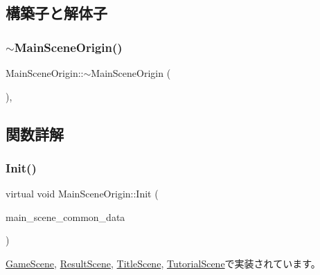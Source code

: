 \subsection{構築子と解体子}
\mbox{\label{class_main_scene_origin_af3fd8cd71354c8392040da486a538d67}} 
\subsubsection{\texorpdfstring{$\sim$\+Main\+Scene\+Origin()}{~MainSceneOrigin()}}
{\footnotesize\ttfamily Main\+Scene\+Origin\+::$\sim$\+Main\+Scene\+Origin (\begin{DoxyParamCaption}{ }\end{DoxyParamCaption})\hspace{0.3cm}{\ttfamily [inline]}, {}}



\subsection{関数詳解}
\mbox{\label{class_main_scene_origin_a4553bd787023f0b74a88687aee42946f}} 
\subsubsection{\texorpdfstring{Init()}{Init()}}
{\footnotesize\ttfamily virtual void Main\+Scene\+Origin\+::\+Init (\begin{DoxyParamCaption}\item[{\mbox{\hyperlink{struct_main_scene_common_data}{Main\+Scene\+Common\+Data}} $\ast$}]{main\+\_\+scene\+\_\+common\+\_\+data }\end{DoxyParamCaption})\hspace{0.3cm}{\ttfamily [pure virtual]}}



\mbox{\hyperlink{class_game_scene_a7a039c276351974fb8f3b7b2d8d9884a}{Game\+Scene}}, \mbox{\hyperlink{class_result_scene_a76b311c6350741dc7ac940c711c77408}{Result\+Scene}}, \mbox{\hyperlink{class_title_scene_a33f6a7f8c876ac243560b28cefbeb7ca}{Title\+Scene}}, \mbox{\hyperlink{class_tutorial_scene_a4db0612165ac7acd56bd3a84264e8767}{Tutorial\+Scene}}で実装されています。

